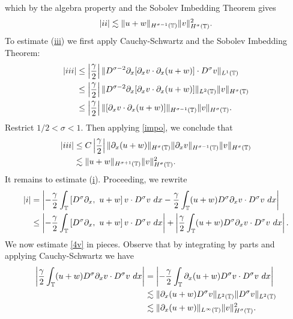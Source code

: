which by the algebra property and the Sobolev
Imbedding Theorem gives
\begin{equation}
\begin{split}
|ii| \lesssim \|u+w\|_{H^{\sigma -1}(\mathbb{T})} \|v\|_{H^\sigma(\mathbb{T})}^2.
\label{3v}
\end{split}
\end{equation}
To estimate (\hyperref[2v]{iii}) we first apply
Cauchy-Schwartz and the Sobolev Imbedding Theorem:
\begin{equation*}
\begin{split}
|iii| & \le	\left | \frac{\gamma}{2} \right | \|D^{\sigma -2} \partial_x
[\partial_x v \cdot \partial_x (u+w)] \cdot D^\sigma v  \|_{L^1(\mathbb{T})} 
\\
& \le  \left | \frac{\gamma}{2} \right | \|D^{\sigma -2} \partial_x
[\partial_x v \cdot \partial_x (u+w)] \|_{L^2(\mathbb{T})}
\|v\|_{H^\sigma(\mathbb{T})}
\\
& \le \left |\frac{\gamma}{2} \right|
\|[\partial_x v \cdot \partial_x (u+w)] \|_{H^{\sigma -1}(\mathbb{T})}
\|v\|_{H^\sigma(\mathbb{T})}.
\end{split}
\end{equation*}
Restrict $1/2 < \sigma < 1$. Then applying \cref{impo}, we conclude
that
\begin{equation}
\begin{split}
|iii|
& \le C \left | \frac{\gamma}{2} \right |
\|\partial_x(u+w) \|_{H^{\sigma}(\mathbb{T})}
\|\partial_x v\|_{H^{\sigma -1}(\mathbb{T})} \|v\|_{H^\sigma(\mathbb{T})}
\\
& \lesssim \|u+w \|_{H^{\sigma + 1}(\mathbb{T})}
\|v\|_{H^\sigma(\mathbb{T})}^2.
\label{3'v}
\end{split}
\end{equation}
It remains to estimate (\hyperref[2v]{i}).
Proceeding, we rewrite
\begin{equation}
\begin{split}
|i| & =
\left |
-\frac{\gamma}{2} \int_{\mathbb{T}} \left[ D^\sigma \partial_x, \ u+w \right]v \cdot
D^\sigma v \ dx - \frac{\gamma}{2} \int_{\mathbb{T}} (u+w) D^\sigma
\partial_x v \cdot D^\sigma v\ dx
\right | 
\\
& \le \left |
-\frac{\gamma}{2} \int_{\mathbb{T}} \left[ D^\sigma \partial_x, \ u+w \right]v \cdot
D^\sigma v \ dx \right |
+ \left | \frac{\gamma}{2} \int_{\mathbb{T}} (u+w) D^\sigma \partial_x v
\cdot D^\sigma v\
dx \right |.
\label{4v}
\end{split}
\end{equation}
We now estimate \eqref{4v} in pieces. Observe that by integrating by parts
and applying Cauchy-Schwartz we have
\begin{equation}
\begin{split}
\left | \frac{\gamma}{2}\int_{\mathbb{T}} (u+w) D^\sigma \partial_x v \cdot
D^\sigma v \ dx \right |
& = \left | -\frac{\gamma}{2} \int_{\mathbb{T}} \partial_x (u+w) D^\sigma v
\cdot D^\sigma v \ dx \right |
\\
& \lesssim \|\partial_x (u+w) D^\sigma v \|_{L^2(\mathbb{T})} \|D^\sigma
v\|_{L^2(\mathbb{T})}
\\
& \lesssim \|\partial_x (u+w)\|_{L^\infty(\mathbb{T})}
\|v\|_{H^\sigma(\mathbb{T})}^2.
\label{4'v}
\end{split}
\end{equation}
